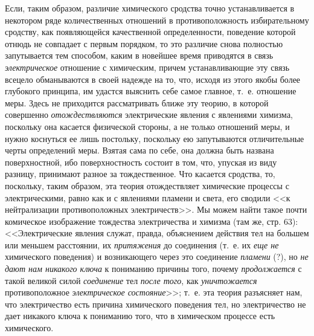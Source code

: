 Если, таким образом, различие химического сродства точно устанавливается в
некотором ряде количественных отношений в противоположность избирательному
сродству, как появляющейся качественной
определенности,
поведение которой отнюдь не совпадает с первым порядком, то это различие
снова полностью запутывается тем способом, каким в новейшее
время
приводятся в связь {\em электрическое} отношение с
химическим, причем устанавливающие эту связь всецело обманываются в своей
надежде на то, что, исходя из этого якобы более глубокого принципа, им
удастся выяснить себе самое главное, т.~е. отношение меры. Здесь не
приходится рассматривать ближе эту теорию, в которой совершенно
{\em отождествляются} электрические явления с явлениями
химизма, поскольку она касается физической стороны, а не только отношений
меры, и нужно коснуться ее лишь постольку, поскольку ею запутываются
отличительные черты определений меры. Взятая сама по себе, она должна быть
названа поверхностной, ибо поверхностность состоит в том, что, упуская из
виду разницу, принимают разное за тождественное. Что касается сродства, то,
поскольку, таким образом, эта теория отождествляет химические процессы с
электрическими, равно как и с явлениями пламени и света, его сводили <<к
нейтрализации противоположных электричеств>>. Мы можем найти такое почти
комическое изображение тождества электричества и химизма (там же, стр. 63):
<<Электрические явления служат, правда, объяснением действия тел на большем
или меньшем расстоянии, их {\em притяжения} до
соединения (т.~е. их {\em еще не} химического
поведения) и возникающего через это соединение
{\em пламени} (?), но {\em не дают
нам никакого ключа} к пониманию причины того, почему
{\em продолжается} с такой великой силой
{\em соединение} тел {\em после
того}, как {\em уничтожается} противоположное
{\em электрическое состояние}>>; т.~е. эта теория
разъясняет нам, что электричество есть причина химического поведения тел,
но электричество не дает никакого ключа к пониманию того, что в химическом
процессе есть химического.

